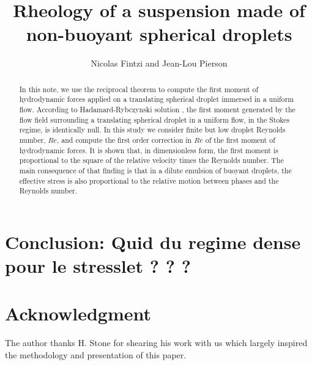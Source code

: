 \documentclass[12pt]{My_preprint}
\title{
    Rheology of a suspension made of non-buoyant spherical droplets
    }
\author[1,2]{Nicolas Fintzi and  Jean-Lou Pierson}
\begin{document}
\maketitle

\begin{abstract}
    In this note, we use the reciprocal theorem to compute the first moment of hydrodynamic forces applied on a translating spherical droplet immersed in a uniform flow. 
    According to Hadamard-Rybczynski solution \citep{kim2013microhydrodynamics}, the first moment generated by the flow field surrounding a translating spherical droplet in a uniform flow, in the Stokes regime, is identically null. 
    In this study we consider finite but low droplet Reynolds number, $Re$, and compute the first order correction in $Re$ of the first moment of hydrodynamic forces. 
    It is shown that, in dimensionless form, the first moment is proportional to the square of the relative velocity times the Reynolds number.  
    The main consequence of that finding is that in a dilute emulsion of buoyant droplets, the effective stress is also proportional to the relative motion between phases and the Reynolds number. 
\end{abstract}







\section{Conclusion: Quid du regime dense pour le stresslet ? ? ? }
\section*{Acknowledgment}

The author thanks H. Stone for shearing his work with us \citep{stone2001inertial} which largely inspired the methodology and presentation of this paper. 



\appendix


\end{document}
